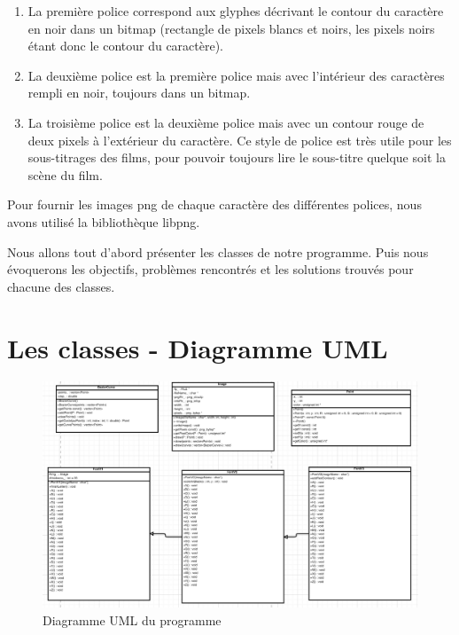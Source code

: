 \documentclass[a4paper, 12pt]{article}
\begin{document}
	\begin{enumerate}
		\item La première police correspond aux glyphes décrivant le contour du caractère en noir dans un bitmap (rectangle de pixels blancs et noirs, les pixels noirs étant donc le contour du caractère). 
		\item La deuxième police est la première police mais avec l’intérieur des caractères rempli en noir, toujours dans un bitmap. 
		\item La troisième police est la deuxième police mais avec un contour rouge de deux pixels à l’extérieur du caractère. Ce style de police est très utile pour les sous-titrages des films, pour pouvoir toujours lire le sous-titre quelque soit la scène du film. 
 	\end{enumerate}

	Pour fournir les images png de chaque caractère des différentes polices, nous avons utilisé la bibliothèque libpng.
\newline

Nous allons tout d’abord présenter les classes de notre programme. Puis nous évoquerons les objectifs, problèmes rencontrés et les solutions trouvés pour chacune des classes.
	
\newpage

\section{Les classes - Diagramme UML}			

\begin{figure}[h]
\centering
\includegraphics[scale=0.2]{Images/diagrammeUML.jpg}
\caption{Diagramme UML du programme}
\label{fig1}
\end{figure}
\end{document}
